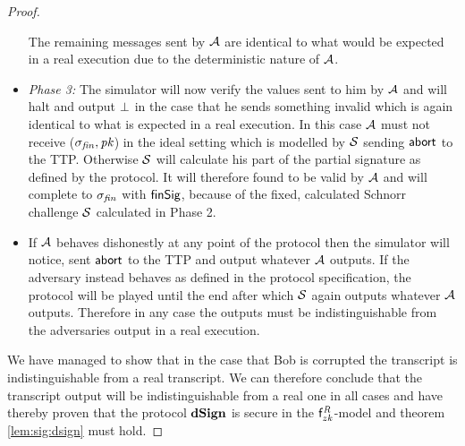 \begin{proof}
\begin{itemize}
        The remaining messages sent by $\mathcal{A}$ are identical to what would be expected in a real execution due to the deterministic nature of $\mathcal{A}$.
        \item \textit{Phase 3: } The simulator will now verify the values sent to him by $\mathcal{A}$ and will halt and output $\bot$ in the case that he sends something invalid which is again identical to what is expected in a real execution.
        In this case $\mathcal{A}$ must not receive ($\sigma_{\mathit{fin}}, \mathit{pk}$) in the ideal setting which is modelled by $\mathcal{S}$ sending $\mathsf{abort}$ to the TTP.
        Otherwise $\mathcal{S}$ will calculate his part of the partial signature as defined by the protocol.
        It will therefore found to be valid by $\mathcal{A}$ and will complete to $\sigma_{\mathit{fin}}$ with $\mathsf{finSig}$, because of the fixed, calculated Schnorr challenge $\mathcal{S}$ calculated in Phase 2.
        \item If $\mathcal{A}$ behaves dishonestly at any point of the protocol then the simulator will notice, sent $\mathsf{abort}$ to the TTP and output whatever $\mathcal{A}$ outputs.
        If the adversary instead behaves as defined in the protocol specification, the protocol will be played until the end after which $\mathcal{S}$ again outputs whatever $\mathcal{A}$ outputs.
        Therefore in any case the outputs must be indistinguishable from the adversaries output in a real execution.
    \end{itemize}

    We have managed to show that in the case that Bob is corrupted the transcript is indistinguishable from a real transcript.
    We can therefore conclude that the transcript output will be indistinguishable from a real one in all cases and have thereby proven that the protocol $\mathbf{dSign}$ is secure in the $\mathsf{f}^{\mathit{R}}_{zk}$-model and theorem \cref{lem:sig:dsign} must hold.
\end{proof}

